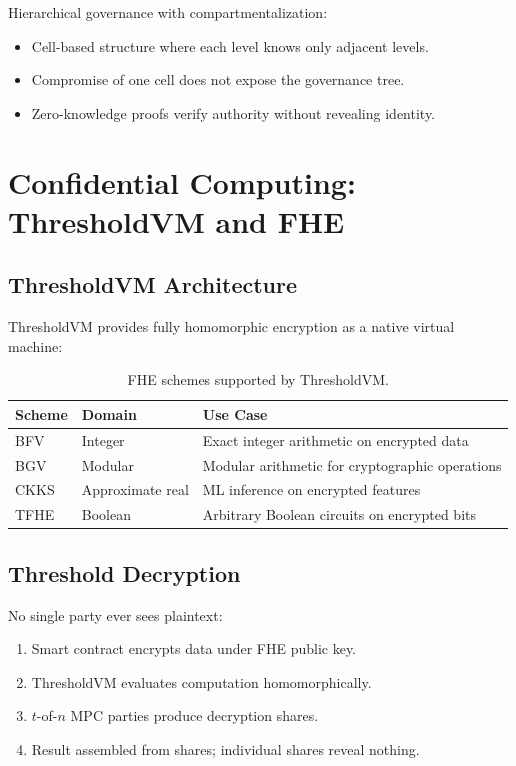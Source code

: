 \documentclass[11pt,letterpaper]{article}
\begin{document}
Hierarchical governance with compartmentalization:
\begin{itemize}
\item Cell-based structure where each level knows only adjacent levels.
\item Compromise of one cell does not expose the governance tree.
\item Zero-knowledge proofs verify authority without revealing identity.
\end{itemize}

\section{Confidential Computing: ThresholdVM and FHE}

\subsection{ThresholdVM Architecture}

ThresholdVM provides fully homomorphic encryption as a native virtual machine:

\begin{table}[H]
\centering
\begin{tabular}{@{}llp{4.5cm}@{}}
\toprule
\textbf{Scheme} & \textbf{Domain} & \textbf{Use Case} \\
\midrule
BFV & Integer & Exact integer arithmetic on encrypted data \\
BGV & Modular & Modular arithmetic for cryptographic operations \\
CKKS & Approximate real & ML inference on encrypted features \\
TFHE & Boolean & Arbitrary Boolean circuits on encrypted bits \\
\bottomrule
\end{tabular}
\caption{FHE schemes supported by ThresholdVM.}
\label{tab:fhe-schemes}
\end{table}

\subsection{Threshold Decryption}

No single party ever sees plaintext:
\begin{enumerate}
\item Smart contract encrypts data under FHE public key.
\item ThresholdVM evaluates computation homomorphically.
\item $t$-of-$n$ MPC parties produce decryption shares.
\item Result assembled from shares; individual shares reveal nothing.
\end{enumerate}
\end{document}
